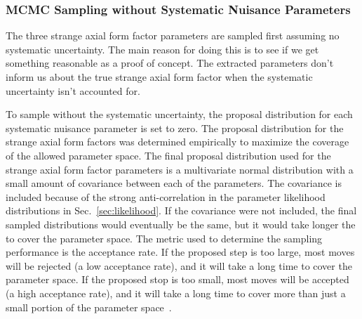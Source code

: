   \subsubsection{MCMC Sampling without Systematic Nuisance Parameters}
    The three strange axial form factor parameters are sampled first assuming no
    systematic uncertainty. The main reason for doing this is to see if we get
    something reasonable as a proof of concept. The extracted parameters don't
    inform us about the true strange axial form factor when the systematic
    uncertainty isn't accounted for.
    
    To sample without the systematic uncertainty, the proposal distribution for
    each systematic nuisance parameter is set to zero. The proposal distribution
    for the strange axial form factors was determined empirically to maximize the
    coverage of the allowed parameter space. The final proposal distribution used
    for the strange axial form factor parameters is a multivariate normal
    distribution with a small amount of covariance between each of the
    parameters. The covariance is included because of the strong anti-correlation
    in the parameter likelihood distributions in Sec.~\ref{sec:likelihood}. If
    the covariance were not included, the final sampled distributions would
    eventually be the same, but it would take longer the to cover the parameter
    space. The metric used to determine the sampling performance is the
    acceptance rate. If the proposed step is too large, most moves will be
    rejected (a low acceptance rate), and it will take a long time to cover the
    parameter space. If the proposed stop is too small, most moves will be
    accepted (a high acceptance rate), and it will take a long time to cover more
    than just a small portion of the parameter space~\cite{Brooks:2011}.
    
